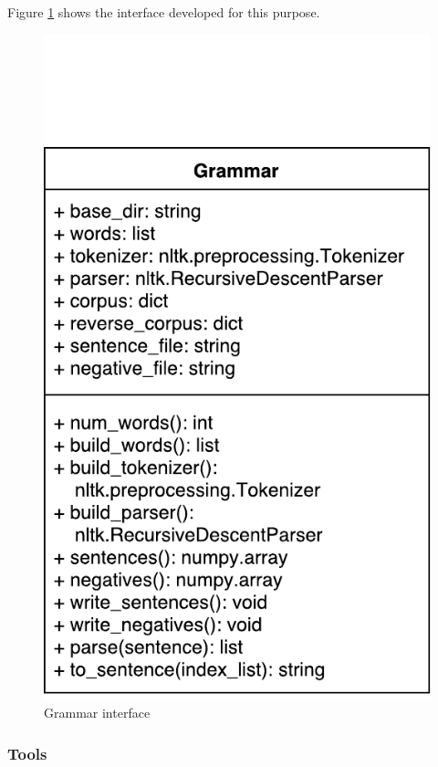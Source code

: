 \documentclass[11pt]{article}
\begin{document}
Figure \ref{fig:grammar} shows the interface developed for this purpose.
\begin{figure}[ht]
    \centering
    \includegraphics[trim={0 0 0 2.45cm},scale=0.7,clip]{img/grammar.pdf}
    \caption{Grammar interface}
    \label{fig:grammar}
\end{figure}

\subsubsection{Tools}
\end{document}
